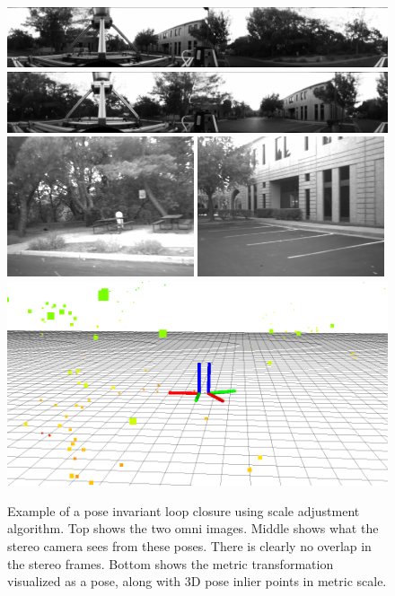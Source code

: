 \begin{figure}[H]
  \centering
    \includegraphics[width=1.0\textwidth]{chapters/images/omni_source}\\
    \includegraphics[width=1.0\textwidth]{chapters/images/omni_target}\\
    \includegraphics[width=0.49\textwidth]{chapters/images/stereo_source}
    \includegraphics[width=0.49\textwidth]{chapters/images/stereo_target}\\
    \includegraphics[width=1.0\textwidth]{chapters/images/loop_closure_pose}
  \caption{Example of a pose invariant loop closure using scale adjustment algorithm.  Top shows the two omni images.  Middle shows what the stereo camera sees from these poses.  There is clearly no overlap in the stereo frames.  Bottom shows the metric transformation visualized as a pose, along with 3D pose inlier points in metric scale.}
  \label{fig:}
\end{figure}
